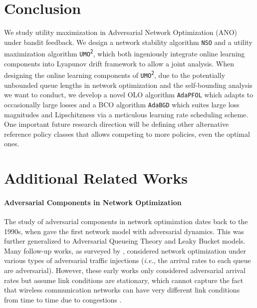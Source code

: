 \documentclass[11pt,fullpage,letterpaper]{article} %
\newcommand{\SSAlg}{\texttt{NSO}\xspace}
\newcommand{\UMAlg}{\texttt{UMO}\textsuperscript{\texttt{2}}\xspace}
\newcommand{\OLOAlg}{\texttt{AdaPFOL}\xspace}
\newcommand{\BCOAlg}{\texttt{AdaBGD}\xspace}
\begin{document}
\section{Conclusion}
We study utility maximization in Adversarial Network Optimization (ANO) under bandit feedback.
We design a network stability algorithm \SSAlg and a utility maximization algorithm \UMAlg, which both ingeniously integrate online learning components into Lyapunov drift framework to allow a joint analysis.
When designing the online learning components of \UMAlg, due to the potentially unbounded queue lengths in network optimization and the self-bounding analysis we want to conduct, we develop a novel OLO algorithm \OLOAlg which adapts to occasionally large losses and a BCO algorithm \BCOAlg which suites large loss magnitudes and Lipschitzness via a meticulous learning rate scheduling scheme.
One important future research direction will be defining other alternative reference policy classes that allows competing to more policies, even the optimal ones.%



\newpage
\appendix
\renewcommand{\appendixpagename}{\centering \LARGE Supplementary Materials}
\appendixpage

\startcontents[section]

\section{Additional Related Works}\label{sec:more related work}
\paragraph{Adversarial Components in Network Optimization}
The study of adversarial components in network optimization dates back to the 1990s, when \citet{cruz1991calculus} gave the first network model with adversarial dynamics. This was further generalized to Adversarial Queueing Theory \citep{borodin2001adversarial} and Leaky Bucket \citep{andrews2001universal} models. Many follow-up works, as surveyed by \citet{cholvi2007stability}, considered network optimization under various types of adversarial traffic injections (\textit{i.e.}, the arrival rates to each queue are adversarial). However, these early works only considered adversarial arrival rates but assume link conditions are stationary, which cannot capture the fact that wireless communication networks can have very different link conditions from time to time due to congestions \citep{zou2016survey}.
\end{document}

